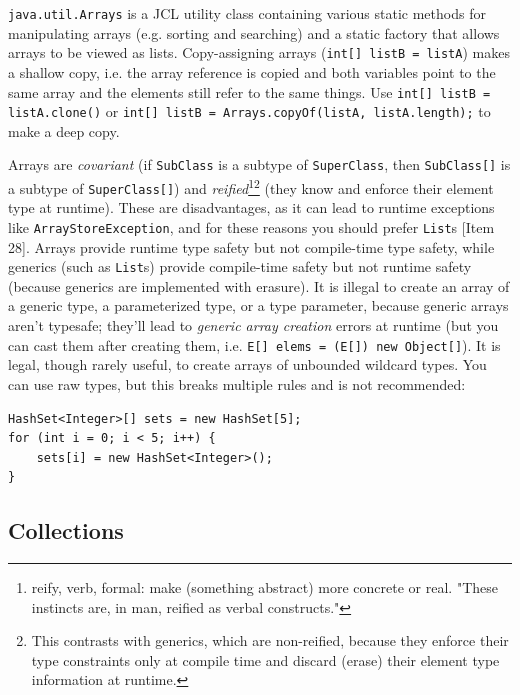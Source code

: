 \documentclass[table, xcdraw]{article}%
\begin{document}
\texttt{java.util.Arrays} is a JCL utility class containing various static methods for manipulating arrays (e.g. sorting and searching) and a static factory that allows arrays to be viewed as lists. Copy-assigning arrays (\texttt{int[] listB = listA}) makes a shallow copy, i.e. the array reference is copied and both variables point to the same array and the elements still refer to the same things. Use \texttt{int[] listB = listA.clone()} or \texttt{int[] listB = Arrays.copyOf(listA, listA.length);} to make a deep copy.

Arrays are \emph{covariant} (if \texttt{SubClass} is a subtype of \texttt{SuperClass}, then \texttt{SubClass[]} is a subtype of \texttt{SuperClass[]}) and \emph{reified}\footnote{reify, verb, formal: make (something abstract) more concrete or real. "These instincts are, in man, reified as verbal constructs."}\footnote{This contrasts with generics, which are non-reified, because they enforce their type constraints only at compile time and discard (erase) their element type information at runtime.} (they know and enforce their element type at runtime). These are disadvantages, as it can lead to runtime exceptions like \texttt{ArrayStoreException}, and for these reasons you should prefer \texttt{List}s [Item 28]. Arrays provide runtime type safety but not compile-time type safety, while generics (such as \texttt{List}s) provide compile-time safety but not runtime safety (because generics are implemented with erasure). It is illegal to create an array of a generic type, a parameterized type, or a type parameter, because generic arrays aren't typesafe; they'll lead to \emph{generic array creation} errors at runtime (but you can cast them after creating them, i.e. \texttt{E[] elems = (E[]) new Object[]}). It is legal, though rarely useful, to create arrays of unbounded wildcard types. You can use raw types, but this breaks multiple rules and is not recommended:

\begin{verbatim}
HashSet<Integer>[] sets = new HashSet[5];
for (int i = 0; i < 5; i++) {
    sets[i] = new HashSet<Integer>();
}
\end{verbatim}

\subsection{Collections}
\end{document}
